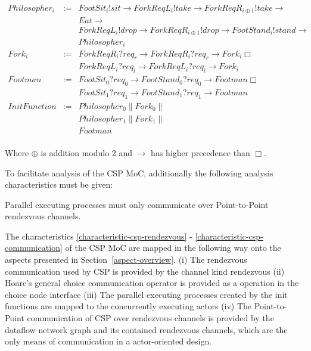 \begin{displaymath}
\begin{array}{rcl}
Philosopher_{i}    & := & FootSit_{i}!sit \to ForkReqL_{i}!take \to ForkReqR_{i\oplus1}!take \to \\
		   &    & Eat \to \\
		   &    & ForkReqL_{i}!drop \to ForkReqR_{i\oplus1}!drop \to FootStand_{i}!stand \to \\
		   &	& Philosopher_{i} \\
Fork_{i}	   & := & ForkReqR_{i}?req_{r} \to ForkReqR_{i}?req_{r} \to Fork_{i} \Box \\
		   &    & ForkReqL_{i}?req_{l} \to ForkReqL_{i}?req_{l} \to Fork_{i} \\
Footman		   & := & FootSit_{0}?req_{0} \to FootStand_{0}?req_{0} \to Footman \Box \\
		   &    & FootSit_{1}?req_{1} \to FootStand_{1}?req_{1} \to Footman \\
InitFunction       & := & Philosopher_{0} \| Fork_{0} \| \\
		   &    & Philosopher_{1} \| Fork_{1} \| \\
		   &    & Footman \\
\end{array}
\end{displaymath}

Where $\oplus$ is addition modulo 2 and $\to$ has higher precedence than $\Box$.

To facilitate analysis of the CSP MoC, additionally the following
analysis characteristics must be given:
\begin{characteristic}\label{characteristic-csp-communication}
  Parallel executing processes must only communicate over Point-to-Point rendezvous channels.
\end{characteristic}

The characteristics \ref{characteristic-csp-rendezvous} -
\ref{characteristic-csp-communication} of the CSP MoC are mapped in the following way
onto the aspects presented in Section~\ref{aspect-overview}.
(i) The rendezvous communication %
used by CSP is provided by the channel kind rendezvous %
(ii) Hoare's general choice communication operator %
is provided as a operation in the choice node interface %
(iii) The parallel executing processes %
created by the init functions are mapped to the concurrently executing actors
(iv) The Point-to-Point communication of CSP over rendezvous channels %
is provided by the dataflow network graph %
and its contained rendezvous channels, which are the only means of communication in a
actor-oriented design.

